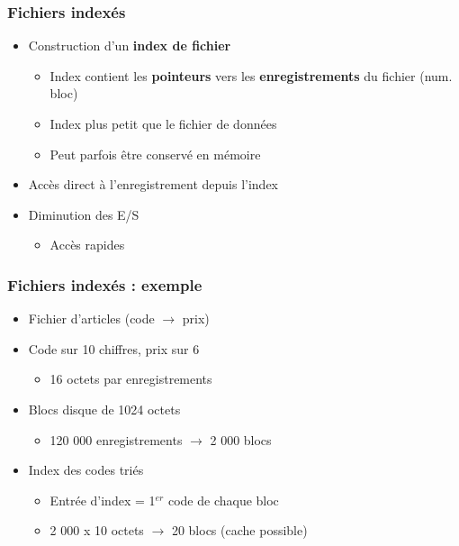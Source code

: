 \begin{frame}
\frametitle{Fichiers indexés}
\begin{itemize}
\item Construction d'un \textbf{index de fichier}
\begin{itemize}
\item Index contient les \textbf{pointeurs} vers les \textbf{enregistrements} du fichier (num. bloc)
\item Index plus petit que le fichier de données
\item Peut parfois être conservé en mémoire
\end{itemize}

\item Accès direct à l'enregistrement depuis l’index
\item Diminution des E/S
\begin{itemize}
\item Accès rapides
\end{itemize}
\end{itemize}
\end{frame}

\begin{frame}
\frametitle{Fichiers indexés : exemple}
\begin{itemize}
\item Fichier d'articles (code $\rightarrow$ prix)
\item Code sur 10 chiffres, prix sur 6
\begin{itemize}
\item 16 octets par enregistrements
\end{itemize}
\item Blocs disque de 1024 octets
\begin{itemize}
\item 120 000 enregistrements $\rightarrow$ 2 000 blocs
\end{itemize}
\item Index des codes triés
\begin{itemize}
\item Entrée d'index = 1$^{er}$ code de chaque bloc
\item 2 000 x 10 octets $\rightarrow$ 20 blocs (cache possible)
\end{itemize}
\end{itemize}
\end{frame}


